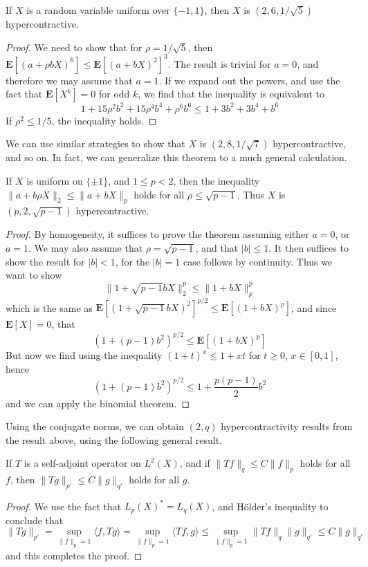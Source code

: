 \begin{theorem}
    If $X$ is a random variable uniform over $\{ -1, 1 \}$, then $X$ is $(2,6,1/\sqrt{5})$ hypercontractive.
\end{theorem}
\begin{proof}
    We need to show that for $\rho = 1/\sqrt{5}$, then $\mathbf{E}[(a + \rho b X)^6] \leq \mathbf{E}[(a + bX)^2]^3$. The result is trivial for $a = 0$, and therefore we may assume that $a = 1$. If we expand out the powers, and use the fact that $\mathbf{E}[X^k] = 0$ for odd $k$, we find that the inequality is equivalent to
    \[ 1 + 15 \rho^2 b^2 + 15 \rho^4 b^4 + \rho^6 b^6 \leq 1 + 3b^2 + 3b^4 + b^6 \]
    If $\rho^2 \leq 1/5$, the inequality holds.
\end{proof}

We can use similar strategies to show that $X$ is $(2,8,1/\sqrt{7})$ hypercontractive, and so on. In fact, we can generalize this theorem to a much general calculation.

\begin{theorem}[(p,2) hypercontractivity]
    If $X$ is uniform on $\{ \pm 1 \}$, and $1 \leq p < 2$, then the inequality $\| a + b \rho X \|_2 \leq \| a + bX \|_p$ holds for all $\rho \leq \sqrt{p-1}$. Thus $X$ is $(p,2,\sqrt{p-1})$ hypercontractive.
\end{theorem}
\begin{proof}
    By homogeneity, it suffices to prove the theorem assuming either $a = 0$, or $a = 1$. We may also assume that $\rho = \sqrt{p-1}$, and that $|b| \leq 1$. It then suffices to show the result for $|b| < 1$, for the $|b| = 1$ case follows by continuity. Thus we want to show
    \[ \| 1 + \sqrt{p-1} b X \|_2^p \leq \| 1 + bX \|_p^p \]
    which is the same as $\mathbf{E}[(1 + \sqrt{p-1} bX)^2]^{p/2} \leq \mathbf{E}[(1 + bX)^p]$, and since $\mathbf{E}[X] = 0$, that
    \[ (1 + (p-1) b^2)^{p/2} \leq \mathbf{E}[(1 + bX)^p] \]
    But now we find using the inequality $(1 + t)^x \leq 1 + xt$ for $t \geq 0$, $x \in [0,1]$, hence
    \[ (1 + (p-1)b^2)^{p/2} \leq 1 + \frac{p(p-1)}{2} b^2 \]
    and we can apply the binomial theorem.
\end{proof}

Using the conjugate norms, we can obtain $(2,q)$ hypercontractivity results from the result above, using the following general result.

\begin{theorem}
    If $T$ is a self-adjoint operator on $L^2(X)$, and if $\| Tf \|_q \leq C \| f \|_p$ holds for all $f$, then $\| Tg \|_{p'} \leq C \| g \|_{q'}$ holds for all $g$.
\end{theorem}
\begin{proof}
    We use the fact that $L_p(X)^* = L_q(X)$, and H\"{o}lder's inequality to conclude that
    \[ \| Tg \|_{p'} = \sup_{\| f \|_p = 1} \langle f, Tg \rangle = \sup_{\| f \|_p = 1} \langle Tf, g \rangle \leq \sup_{\| f \|_p = 1} \| Tf \|_q \| g \|_{q'} \leq C \| g \|_{q'} \]
    and this completes the proof.
\end{proof}

